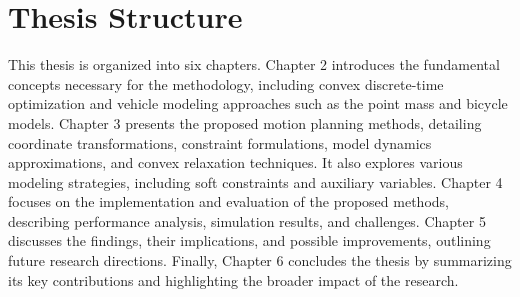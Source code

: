 \section{Thesis Structure} \label{sec:thesis_structure}
This thesis is organized into six chapters.
Chapter 2 introduces the fundamental concepts necessary for the methodology, including convex discrete-time optimization and vehicle modeling
approaches such as the point mass and bicycle models.
Chapter 3 presents the proposed motion planning methods, detailing coordinate transformations, constraint formulations, model dynamics
approximations, and convex relaxation techniques.
It also explores various modeling strategies, including soft constraints and auxiliary variables.
Chapter 4 focuses on the implementation and evaluation of the proposed methods, describing performance analysis, simulation results, and challenges.
Chapter 5 discusses the findings, their implications, and possible improvements, outlining future research directions.
Finally, Chapter 6 concludes the thesis by summarizing its key contributions and highlighting the broader impact of the research.
